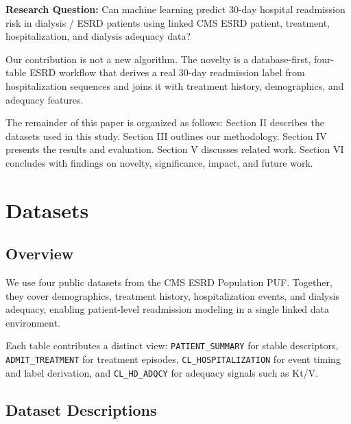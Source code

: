 \documentclass[conference]{IEEEtran}
\begin{document}
\noindent\textbf{Research Question:} Can machine learning predict 30-day hospital readmission risk in dialysis / ESRD patients using linked CMS ESRD patient, treatment, hospitalization, and dialysis adequacy data?

Our contribution is not a new algorithm. The novelty is a database-first, four-table ESRD workflow that derives a real 30-day readmission label from hospitalization sequences and joins it with treatment history, demographics, and adequacy features.

The remainder of this paper is organized as follows: Section II describes the datasets used in this study. Section III outlines our methodology. Section IV presents the results and evaluation. Section V discusses related work. Section VI concludes with findings on novelty, significance, impact, and future work.

\section{Datasets}
\subsection{Overview}
We use four public datasets from the CMS ESRD Population PUF. Together, they cover demographics, treatment history, hospitalization events, and dialysis adequacy, enabling patient-level readmission modeling in a single linked data environment.

Each table contributes a distinct view: \texttt{PATIENT_SUMMARY} for stable descriptors, \texttt{ADMIT_TREATMENT} for treatment episodes, \texttt{CL_HOSPITALIZATION} for event timing and label derivation, and \texttt{CL_HD_ADQCY} for adequacy signals such as Kt/V.

\subsection{Dataset Descriptions}
\end{document}
